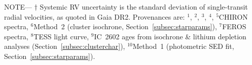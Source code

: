 \begin{table*}
\begin{flushleft}
 \footnotesize{ \textsc{NOTE}---
$\dagger$ Systemic RV uncertainty is the standard deviation of single-transit radial velocities, as quoted in Gaia DR2. %
Provenances are:
$^1$\citet{gaia_collaboration_gaia_2018},
$^2$\citet{stassun_TIC8_2019},
$^3$\citet{skrutskie_tmass_2006},
$^4$\citet{wright_WISE_2010},
$^5$CHIRON spectra,
$^6$Method~2 (cluster isochrone, Section~\ref{subsec:starparams}),
$^7$FEROS spectra,
$^8$TESS light curve,
$^9$IC~2602 ages from isochrone \& lithium depletion analyses (Section~\ref{subsec:clusterchar}),
$^{10}$Method~1 (photometric SED fit, Section~\ref{subsec:starparams}).}
\end{flushleft}
\vspace{-0.5cm}
\end{table*}

